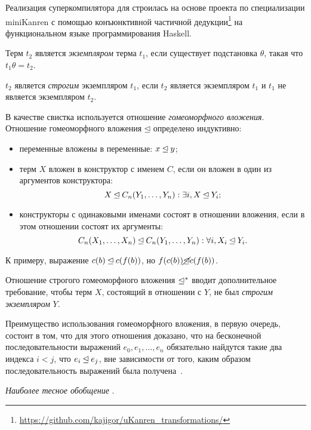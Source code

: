 Реализация суперкомпилятора для \ukanren строилась на основе проекта по специализации miniKanren с помощью конъюнктивной частичной
дедукции\footnote{\url{https://github.com/kajigor/uKanren_transformations/}} на функциональном языке программирования Haskell.

Терм $t_2$ является \emph{экземпляром}  терма $t_1$, если
существует подстановка $\theta$, такая что $t_1 \theta = t_2$.

$t_2$ является \emph{строгим} экземпляром $t_1$, если  $t_2$ является экземпляром $t_1$ и
$t_1$ не является экземпляром $t_2$.


В качестве свистка используется отношение \emph{гомеоморфного вложения}.\cite{scGen}
Отношение гомеоморфного вложения $\unlhd$ определено индуктивно:
\begin{itemize}
\item переменные вложены в переменные: $x \unlhd y$;
\item терм $X$ вложен в конструктор с именем $C$, если он вложен в один из аргументов конструктора:
      $$X \unlhd C_n(Y_1, \dots, Y_n): \exists i, X \unlhd Y_i;$$
\item конструкторы с одинаковыми именами состоят в отношении вложения, если в этом отношении
      состоят их аргументы:
      $$C_n(X_1, \dots, X_n) \unlhd C_n(Y_1, \dots, Y_n): \forall i, X_i \unlhd Y_i.$$
\end{itemize}

К примеру, выражение $c(b) \unlhd c(f(b))$, но $f(c(b)) \cancel{\unlhd} c(f(b))$.

Отношение строгого гомеоморфного вложения $\unlhd^*$ вводит дополнительное
требование, чтобы терм $X$, состоящий в отношении с $Y$, не был \emph{строгим экземпляром} $Y$. 

Преимущество использования гомеоморфного вложения, в первую очередь, состоит в том,
что для этого отношения доказано, что на бесконечной последовательности выражений $e_0, e_1, \dots, e_n$
обязательно найдутся такие два индекса $i < j$, что $e_i \unlhd e_j$, вне зависимости
от того, каким образом последовательность выражений была получена~\cite{scPos}.





\emph{Наиболее тесное обобщение}  .

